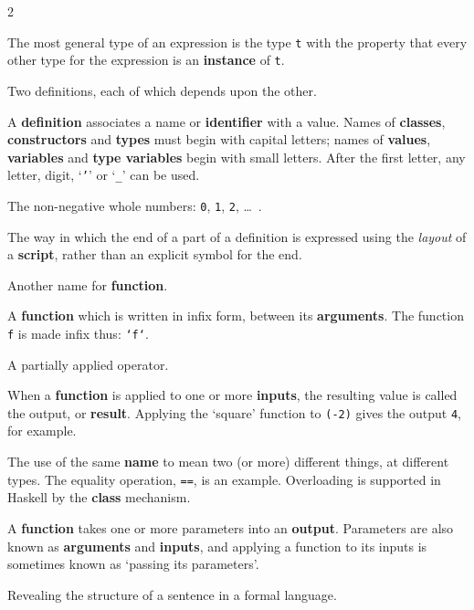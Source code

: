 \begin{multicols}{2}
{
The most general type of an expression is the type \texttt{t} with the property
that every other type for the expression is an \textbf{instance} of \texttt{t}.

Two definitions, each of which depends upon the other.

A \textbf{definition} associates a name or \textbf{identifier} with a value. Names
of \textbf{classes}, \textbf{constructors} and \textbf{types}
must begin with capital letters; names of 
\textbf{values}, \textbf{variables} and \textbf{type variables}
begin with small letters. After the first letter, any
letter, digit, `\texttt{'}' or `\texttt{\_}' can be used.

The non-negative whole numbers: \texttt{0}, \texttt{1}, \texttt{2}, \ldots\ .

The way in which the end of a part of a definition is expressed using the
{\em layout\/} of a \textbf{script}, rather than an explicit symbol for the end.

Another name for \textbf{function}.

A \textbf{function} which is written in infix form, between its \textbf{arguments}.
The function \texttt{f} is made infix thus: \texttt{`f`}. 

A partially applied operator.

When a \textbf{function} is applied to one or more \textbf{inputs}, the resulting
value is called the output, or \textbf{result}. Applying the `square' function
to \texttt{(-2)} gives the output \texttt{4}, for example.

The use of the same \textbf{name} to mean two (or more) different things, at
different types. The equality operation, \texttt{==},  is an example. Overloading
is
supported in Haskell by the \textbf{class} mechanism.

A \textbf{function} takes one or more parameters into an \textbf{output}. Parameters
are also known as \textbf{arguments} and \textbf{inputs}, and applying a function
to its inputs is sometimes known as `passing its parameters'. 

Revealing the structure of a sentence in a formal language.

}
\end{multicols}
